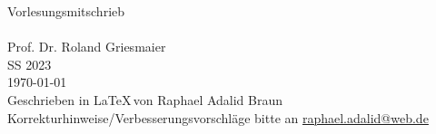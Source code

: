 \begin{titlepage}
	\begin{center}
		\vspace*{\fill}
		\begin{center}
			\vspace{5cm}
			{\LARGE Vorlesungsmitschrieb}\\[0.5cm]
			{\Huge {}}\\[0.4cm]
			{\Large Prof. Dr. Roland Griesmaier}\\[0.4cm]
			{\Large SS 2023}\\[2cm]
			{\large\today}\\[12cm]
			{\large Geschrieben in \LaTeX\,von Raphael Adalid Braun}
			{Korrekturhinweise/Verbesserungsvorschläge bitte an \href{mailto:raphael.adalid@web.de}{raphael.adalid@web.de}}
		\end{center}
		\vspace*{\fill}

			
	\end{center}
\end{titlepage}